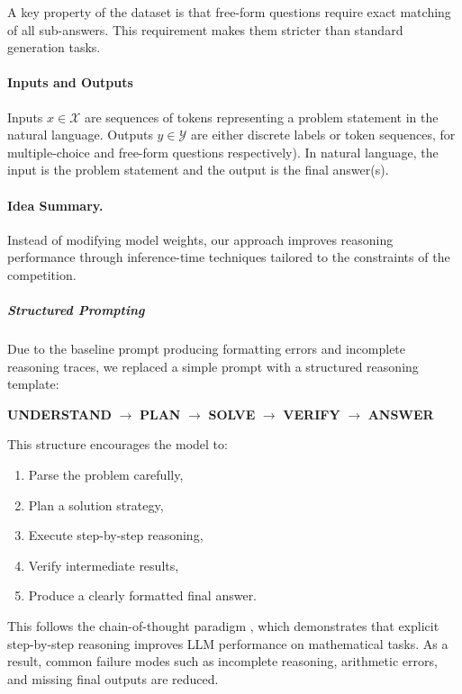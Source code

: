 \documentclass{article}
\begin{document}
A key property of the dataset is that free-form questions require exact matching of all sub-answers. This requirement makes them stricter than standard generation tasks.

\paragraph{Inputs and Outputs} 
Inputs $x \in \mathcal{X}$ are sequences of tokens representing a problem statement in the natural language. Outputs $y \in \mathcal{Y}$ are either discrete labels or token sequences, for multiple-choice and free-form questions respectively). In natural language, the input is the problem statement and the output is the final answer(s).

\paragraph{Idea Summary.}

Instead of modifying model weights, our approach improves reasoning performance through inference-time techniques tailored to the constraints of the competition.

\subparagraph{Structured Prompting} Due to the baseline prompt producing formatting errors and incomplete reasoning traces, we replaced a simple prompt with a structured reasoning template:
\begin{center}
    \textbf{UNDERSTAND} $\rightarrow$ \textbf{PLAN} $\rightarrow$ \textbf{SOLVE} $\rightarrow$ \textbf{VERIFY} $\rightarrow$ \textbf{ANSWER}
\end{center}

This structure encourages the model to:
\begin{enumerate}
    \item Parse the problem carefully,
    \item Plan a solution strategy,
    \item Execute step-by-step reasoning,
    \item Verify intermediate results,
    \item Produce a clearly formatted final answer.
\end{enumerate}

This follows the chain-of-thought paradigm \citet{wei2022cot}, which demonstrates that explicit step-by-step reasoning improves LLM performance on mathematical tasks. As a result, common failure modes such as incomplete reasoning, arithmetic errors, and missing final outputs are reduced.
\end{document}
